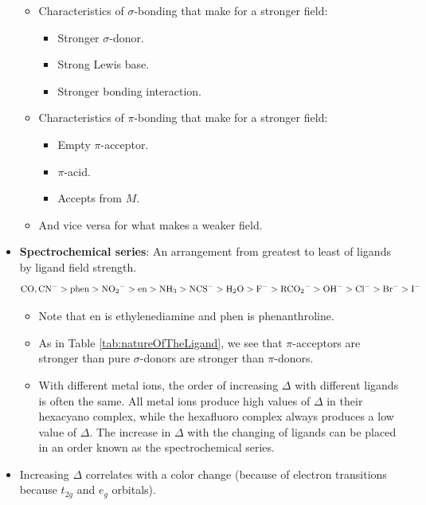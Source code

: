 \documentclass[../notes.tex]{subfiles}
\begin{document}
\begin{itemize}
    \begin{itemize}
        \item Characteristics of $\sigma$-bonding that make for a stronger field:
        \begin{itemize}
            \item Stronger $\sigma$-donor.
            \item Strong Lewis base.
            \item Stronger bonding interaction.
        \end{itemize}
        \item Characteristics of $\pi$-bonding that make for a stronger field:
        \begin{itemize}
            \item Empty $\pi$-acceptor.
            \item $\pi$-acid.
            \item Accepts from $M$.
        \end{itemize}
        \item And vice versa for what makes a weaker field.
    \end{itemize}
    \item \textbf{Spectrochemical series}: An arrangement from greatest to least of ligands by ligand field strength.
    \begin{equation*}
        \ce{CO},\ce{CN-} > \text{phen}
        > \ce{NO2-}
        > \text{en}
        > \ce{NH3}
        > \ce{NCS-}
        > \ce{H2O}
        > \ce{F-}
        > \ce{RCO2-}
        > \ce{OH-}
        > \ce{Cl-}
        > \ce{Br-}
        > \ce{I-}
    \end{equation*}
    \begin{itemize}
        \item Note that en is ethylenediamine and phen is phenanthroline.
        \item As in Table \ref{tab:natureOfTheLigand}, we see that $\pi$-acceptors are stronger than pure $\sigma$-donors are stronger than $\pi$-donors.
        \item With different metal ions, the order of increasing $\Delta$ with different ligands is often the same. All metal ions produce high values of $\Delta$ in their hexacyano complex, while the hexafluoro complex always produces a low value of $\Delta$. The increase in $\Delta$ with the changing of ligands can be placed in an order known as the spectrochemical series.
    \end{itemize}
    \item Increasing $\Delta$ correlates with a color change (because of electron transitions because $t_{2g}$ and $e_g$ orbitals).
\end{itemize}
\end{document}
